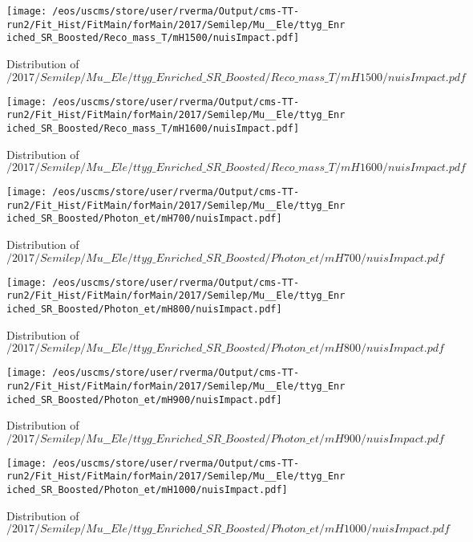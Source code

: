 \begin{figure}
\centering
\texttt{[image: /eos/uscms/store/user/rverma/Output/cms-TT-run2/Fit\_Hist/FitMain/forMain/2017/Semilep/Mu\_\_Ele/ttyg\_Enriched\_SR\_Boosted/Reco\_mass\_T/mH1500/nuisImpact.pdf]}
\caption{Distribution of $/2017/Semilep/Mu\_\_Ele/ttyg\_Enriched\_SR\_Boosted/Reco\_mass\_T/mH1500/nuisImpact.pdf$}
\end{figure}

\begin{figure}
\centering
\texttt{[image: /eos/uscms/store/user/rverma/Output/cms-TT-run2/Fit\_Hist/FitMain/forMain/2017/Semilep/Mu\_\_Ele/ttyg\_Enriched\_SR\_Boosted/Reco\_mass\_T/mH1600/nuisImpact.pdf]}
\caption{Distribution of $/2017/Semilep/Mu\_\_Ele/ttyg\_Enriched\_SR\_Boosted/Reco\_mass\_T/mH1600/nuisImpact.pdf$}
\end{figure}

\begin{figure}
\centering
\texttt{[image: /eos/uscms/store/user/rverma/Output/cms-TT-run2/Fit\_Hist/FitMain/forMain/2017/Semilep/Mu\_\_Ele/ttyg\_Enriched\_SR\_Boosted/Photon\_et/mH700/nuisImpact.pdf]}
\caption{Distribution of $/2017/Semilep/Mu\_\_Ele/ttyg\_Enriched\_SR\_Boosted/Photon\_et/mH700/nuisImpact.pdf$}
\end{figure}

\begin{figure}
\centering
\texttt{[image: /eos/uscms/store/user/rverma/Output/cms-TT-run2/Fit\_Hist/FitMain/forMain/2017/Semilep/Mu\_\_Ele/ttyg\_Enriched\_SR\_Boosted/Photon\_et/mH800/nuisImpact.pdf]}
\caption{Distribution of $/2017/Semilep/Mu\_\_Ele/ttyg\_Enriched\_SR\_Boosted/Photon\_et/mH800/nuisImpact.pdf$}
\end{figure}

\begin{figure}
\centering
\texttt{[image: /eos/uscms/store/user/rverma/Output/cms-TT-run2/Fit\_Hist/FitMain/forMain/2017/Semilep/Mu\_\_Ele/ttyg\_Enriched\_SR\_Boosted/Photon\_et/mH900/nuisImpact.pdf]}
\caption{Distribution of $/2017/Semilep/Mu\_\_Ele/ttyg\_Enriched\_SR\_Boosted/Photon\_et/mH900/nuisImpact.pdf$}
\end{figure}

\begin{figure}
\centering
\texttt{[image: /eos/uscms/store/user/rverma/Output/cms-TT-run2/Fit\_Hist/FitMain/forMain/2017/Semilep/Mu\_\_Ele/ttyg\_Enriched\_SR\_Boosted/Photon\_et/mH1000/nuisImpact.pdf]}
\caption{Distribution of $/2017/Semilep/Mu\_\_Ele/ttyg\_Enriched\_SR\_Boosted/Photon\_et/mH1000/nuisImpact.pdf$}
\end{figure}

